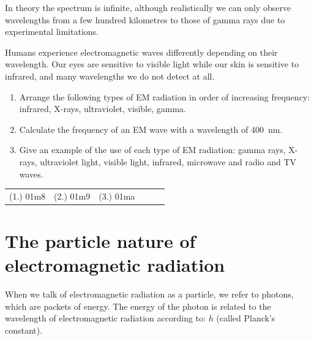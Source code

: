 In theory the spectrum is infinite, although realistically we can only observe wavelengths from a few hundred kilometres to those of gamma rays due to experimental limitations. 

Humans experience electromagnetic waves differently depending on their wavelength. Our eyes are sensitive to visible light while our skin is sensitive to infrared, and many wavelengths we do not detect at all.

{
\begin{enumerate}
\item Arrange the following types of EM radiation in order of increasing frequency: infrared, X-rays, ultraviolet, visible, gamma. 
\item Calculate the frequency of an EM wave with a wavelength of 400~nm.
\item Give an example of the use of each type of EM radiation: gamma rays, X-rays, ultraviolet light, visible light, infrared, microwave and radio and TV waves.
\end{enumerate}

\vspace{-0.75cm}
\par \practiceinfo
\vspace{-0.5cm}
\par \begin{tabular}[h]{cccccc}
(1.)	01m8	&
(2.)	01m9	&
(3.)	01ma	&
\end{tabular}
}

\clearpage

\section{The particle nature of electromagnetic radiation}

When we talk of electromagnetic radiation as a particle, we refer to photons, which are packets of energy. The energy of the photon is related to the wavelength of electromagnetic radiation according to:
$h$ (called Planck's constant).

